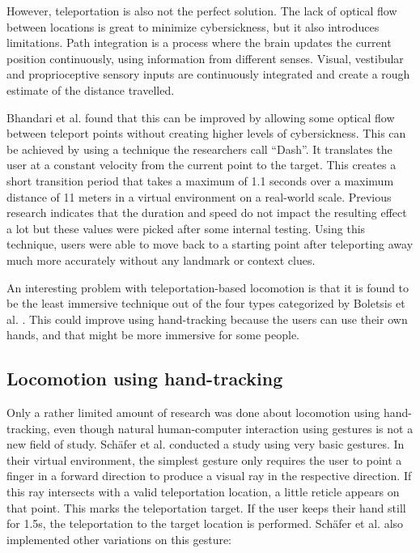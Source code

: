 However, teleportation is also not the perfect solution. 
The lack of optical flow between locations is great to minimize
cybersickness, but it also introduces limitations. 
Path integration is a process where the brain updates the current position
continuously, using information from different senses. Visual, vestibular
and proprioceptive sensory inputs are continuously integrated and create
a rough estimate of the distance travelled. \cite{Bhandari}

Bhandari et al. \cite{Bhandari} found that this can be improved by allowing some optical
flow between teleport points without creating higher levels of
cybersickness. This can be achieved by using a technique the researchers
call ``Dash''. It translates the user at a constant velocity from the
current point to the target. This creates a short transition period that
takes a maximum of 1.1 seconds over a maximum distance of 11 meters in a
virtual environment on a real-world scale. Previous research indicates
that the duration and speed do not impact the resulting effect a lot
\cite{Bowman} but these values were picked after some
internal testing. Using this technique, users were able to move back to
a starting point after teleporting away much more accurately without any
landmark or context clues. 

An interesting problem with teleportation-based locomotion is that it is
found to be the least immersive technique out of the four types
categorized by Boletsis et al. \cite{Boletsis}. This
could improve using hand-tracking because the users can use their own
hands, and that might be more immersive for some people.


\subsection{Locomotion using hand-tracking}\label{locomotion-using-hand-tracking}

Only a rather limited amount of research was done about locomotion using hand-tracking, even though natural human-computer interaction using gestures is not a new field of study. Schäfer et al. \cite{Schafer2021} conducted a study using very basic gestures. In their virtual environment, the simplest gesture only requires the user to point a finger in a forward direction to produce a visual ray in the respective direction. If this ray intersects with a valid teleportation location, a little reticle appears on that point. This marks the teleportation target. If the user keeps their hand still for 1.5s, the teleportation to the target location is performed. Schäfer et al. also implemented other variations on this gesture:


